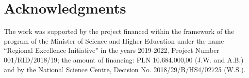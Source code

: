 \documentclass[5p,times]{elsarticle}
\begin{document}
\section*{Acknowledgments}
The work was supported by the project financed within the framework of the program of the Minister of Science and Higher Education under the name “Regional Excellence Initiative” in the years 2019-2022, Project Number 001/RID/2018/19; the amount of financing: PLN 10.684.000,00 (J.W. and A.B.) and by the National Science Centre, Decision No. 2018/29/B/HS4/02725 (W.S.).


\end{document}
